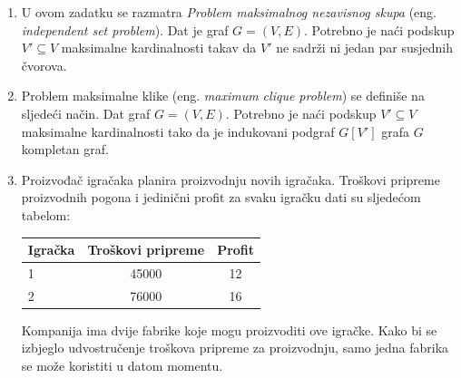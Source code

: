\documentclass[b5paper, utf8, 11pt, colorlinks]{book}
\theoremstyle{definition}
\begin{document}
\begin{enumerate}
	\item U ovom zadatku se razmatra  \emph{Problem maksimalnog nezavisnog skupa} (eng. \emph{independent set problem}). Dat je graf $G = (V, E)$. Potrebno je naći podskup $V' \subseteq V$ maksimalne kardinalnosti takav da  $V'$ ne sadrži ni jedan par susjednih čvorova. 
	\item Problem maksimalne klike (eng. \emph{maximum clique problem}) se definiše na sljedeći način.  Dat graf $G = (V, E)$. Potrebno je naći podskup $V' \subseteq V$ maksimalne kardinalnosti tako da je indukovani podgraf 
	$G[V']$ grafa $G$ kompletan graf. 
	\item %
	Proizvođač igračaka planira proizvodnju novih igračaka. Troškovi pripreme proizvodnih pogona i jedinični profit za svaku igračku dati su sljedećom tabelom: 
	\begin{table}[H]
		\centering
		\begin{tabular}{l|cc} 
			\hline
			Igračka &  Troškovi pripreme    & Profit \\ \hline
			1       &  45000     &  12     \\
			2       &  76000     &  16     \\	\hline
		\end{tabular} 
	\end{table}
	Kompanija ima dvije fabrike koje mogu proizvoditi ove igračke. Kako bi se izbjeglo udvostručenje troškova pripreme za proizvodnju,  samo jedna fabrika se može koristiti u datom momentu. 
	

\end{enumerate}
\end{document}
